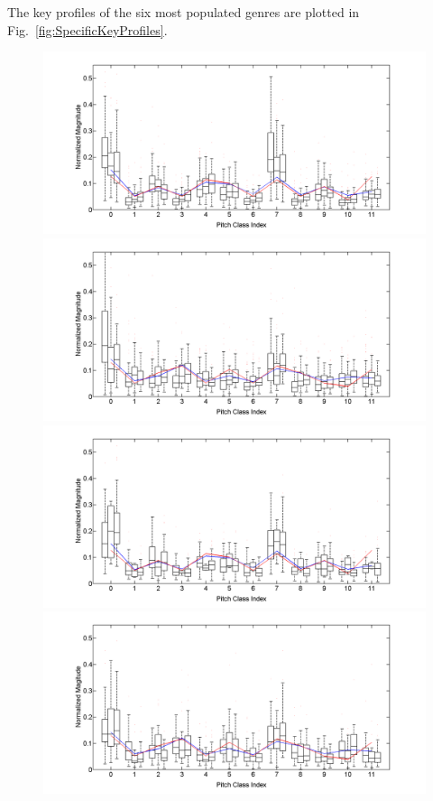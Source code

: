 \documentclass{article}
\begin{document}
The key profiles of the six most populated genres are plotted in Fig.~\ref{fig:SpecificKeyProfiles}.
\begin{figure}[tb]\setcounter{figure}{3}
\centering
    \includegraphics[scale=.2]{graph/boxPlotsMajCPR+Krum+Temp}
    \includegraphics[scale=.2]{graph/boxPlotsMinBHP+Krum+Temp}
    \includegraphics[scale=.2]{graph/boxPlotsMajDJRk+Krum+Temp}
    \includegraphics[scale=.2]{graph/boxPlotsMinDMR+Krum+Temp}

\end{figure}
\end{document}
